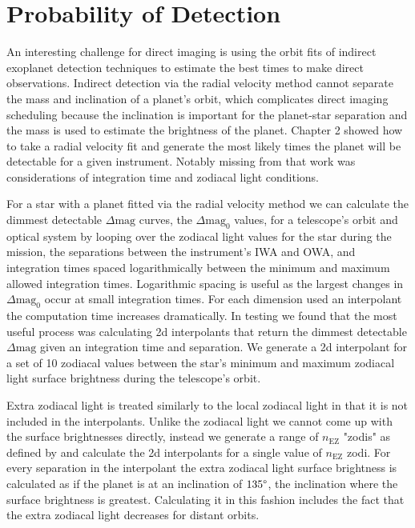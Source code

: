 
\section{Probability of Detection} %
\label{section:impact_on_pdet}

An interesting challenge for direct imaging is using the orbit fits of indirect
exoplanet detection techniques to estimate the best times to make direct
observations. Indirect detection via the radial velocity method cannot separate
the mass and inclination of a planet's orbit, which complicates direct imaging
scheduling because the inclination is important for the planet-star separation
and the mass is used to estimate the brightness of the planet. Chapter 2 showed
how to take a radial velocity fit and generate the most likely times the planet
will be detectable for a given instrument. Notably missing from that work was
considerations of integration time and zodiacal light conditions.

For a star with a planet fitted via the radial velocity method we can calculate
the dimmest detectable $\Delta\textrm{mag}$ curves, the $\Delta\textrm{mag}_0$
values, for a telescope's orbit and optical system by looping over the zodiacal
light values for the star during the mission, the separations between the
instrument's IWA and OWA, and integration times spaced logarithmically between
the minimum and maximum allowed integration times. Logarithmic spacing is
useful as the largest changes in $\Delta\textrm{mag}_0$ occur at small
integration times. For each dimension used an interpolant the computation time
increases dramatically. In testing we found that the most useful process was
calculating 2d interpolants that return the dimmest detectable
$\Delta\textrm{mag}$ given an integration time and separation. We generate a 2d
interpolant for a set of 10 zodiacal values between the star's minimum and
maximum zodiacal light surface brightness during the telescope's orbit. 

Extra zodiacal light is treated similarly to the local zodiacal light in that
it is not included in the interpolants. Unlike the zodiacal light we cannot
come up with the surface brightnesses directly, instead we generate a range of
$n_\textrm{EZ}$ "zodis" as defined by
\citet{starkMaximizingExoEarthCandidate2014} and calculate the 2d interpolants
for a single value of $n_\textrm{EZ}$ zodi. For every separation in the
interpolant the extra zodiacal light surface brightness is calculated as if the
planet is at an inclination of $135\degree$, the inclination where the surface
brightness is greatest. Calculating it in this fashion includes the fact that
the extra zodiacal light decreases for distant orbits.


